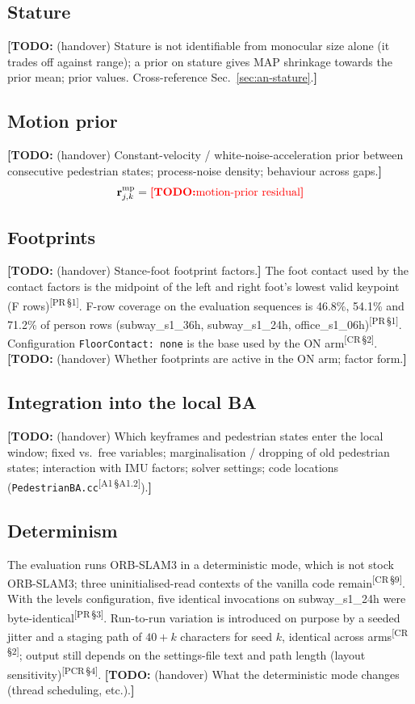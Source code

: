 \documentclass[journal]{IEEEtran}
\newcommand{\TODO}[1]{{\color{red}\textbf{[TODO:} #1\textbf{]}}}
\newcommand{\src}[1]{\textsuperscript{\color{blue}\scriptsize[#1]}}
\begin{document}
\subsection{Stature}
\TODO{(handover) Stature is not identifiable from monocular size alone (it
trades off against range); a prior on stature gives MAP shrinkage towards the
prior mean; prior values. Cross-reference Sec.~\ref{sec:an-stature}.}

\subsection{Motion prior}
\TODO{(handover) Constant-velocity / white-noise-acceleration prior between
consecutive pedestrian states; process-noise density; behaviour across gaps.}
\begin{equation}
  \mathbf{r}^{\text{mp}}_{j,k} = \TODO{\text{motion-prior residual}}
\end{equation}

\subsection{Footprints}
\TODO{(handover) Stance-foot footprint factors.} The foot contact used by the
contact factors is the midpoint of the left and right foot's lowest valid
keypoint (F rows)\src{PR\,\S1}. F-row coverage on the evaluation sequences is
46.8\%, 54.1\% and 71.2\% of person rows (subway\_s1\_36h, subway\_s1\_24h,
office\_s1\_06h)\src{PR\,\S1}. Configuration \texttt{FloorContact: none} is the
base used by the ON arm\src{CR\,\S2}. \TODO{(handover) Whether footprints are
active in the ON arm; factor form.}

\subsection{Integration into the local BA}
\TODO{(handover) Which keyframes and pedestrian states enter the local window;
fixed vs.\ free variables; marginalisation / dropping of old pedestrian states;
interaction with IMU factors; solver settings; code locations
(\texttt{PedestrianBA.cc}\src{A1\,\S A1.2}).}

\subsection{Determinism}
The evaluation runs ORB-SLAM3 in a deterministic mode, which is not stock
ORB-SLAM3; three uninitialised-read contexts of the vanilla code
remain\src{CR\,\S9}. With the levels configuration, five identical invocations
on subway\_s1\_24h were byte-identical\src{PR\,\S3}. Run-to-run variation is
introduced on purpose by a seeded jitter and a staging path of $40+k$
characters for seed $k$, identical across arms\src{CR\,\S2}; output still
depends on the settings-file text and path length (layout
sensitivity)\src{PCR\,\S4}. \TODO{(handover) What the deterministic mode
changes (thread scheduling, etc.).}
\end{document}

